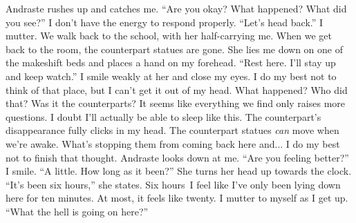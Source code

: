 \documentclass[a4paper, 12pt]{book}
\newcommand\tab[1][1cm]{\hspace*{#1}}
\begin{document}
\newline
\tab
Andraste rushes up and catches me. ``Are you okay? What happened? What did you see?''
\newline
\tab
I don’t have the energy to respond properly. ``Let’s head back.'' I mutter.
\newline
\tab
We walk back to the school, with her half-carrying me. When we get back to the room, the counterpart statues are gone. She lies me down on one of the makeshift beds and places a hand on my forehead. ``Rest here. I’ll stay up and keep watch.'' I smile weakly at her and close my eyes. I do my best not to think of that place, but I can’t get it out of my head. What happened? Who did that? Was it the counterparts? It seems like everything we find only raises more questions. I doubt I’ll actually be able to sleep like this. The counterpart’s disappearance fully clicks in my head. The counterpart statues \textit{can} move when we’re awake. What’s stopping them from coming back here and... I do my best not to finish that thought. Andraste looks down at me. ``Are you feeling better?''
\newline
\tab
I smile. ``A little. How long as it been?''
\newline
\tab
She turns her head up towards the clock. ``It’s been six hours,'' she states. Six hours\textinterrobang\, I feel like I’ve only been lying down here for ten minutes. At most, it feels like twenty.
\newline
\tab
I mutter to myself as I get up. ``What the hell is going on here?''
\end{document}
